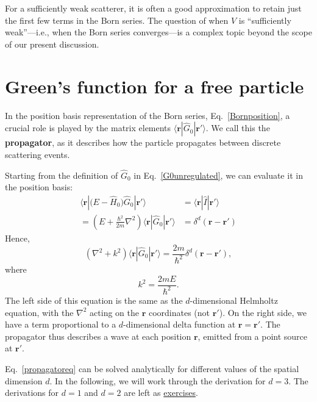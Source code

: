 \documentclass[prx,12pt]{revtex4-2}
\begin{document}
For a sufficiently weak scatterer, it is often a good approximation to
retain just the first few terms in the Born series.  The question of
when $\hat{V}$ is ``sufficiently weak''---i.e., when the Born series
converges---is a complex topic beyond the scope of our present
discussion.

\section{Green's function for a free particle}
\label{sec:freegreen}

In the position basis representation of the Born series,
Eq.~\eqref{Bornposition}, a crucial role is played by the matrix
elements $\langle\mathbf{r}|\hat{G}_0|\mathbf{r}'\rangle$.  We call
this the \textbf{propagator}, as it describes how the particle
propagates between discrete scattering events.

Starting from the definition of $\hat{G}_0$ in
Eq.~\eqref{G0unregulated}, we can evaluate it in the position basis:
\begin{align*}
  \langle\mathbf{r} |\big(E-\hat{H}_0\big) \hat{G}_0 |\mathbf{r}'\rangle &= \langle\mathbf{r}|\hat{I}|\mathbf{r}'\rangle \\
  = \left(E + \frac{\hbar^2}{2m}\nabla^2 \right) \langle\mathbf{r} |\hat{G}_0 |\mathbf{r}'\rangle &= \delta^d(\mathbf{r}-\mathbf{r}')
\end{align*}
Hence,
\begin{equation}
  \left(\nabla^2 + k^2\right) \langle\mathbf{r} |\hat{G}_0 |\mathbf{r}'\rangle = \frac{2m}{\hbar^2} \delta^d(\mathbf{r}-\mathbf{r}'),
  \label{propagatoreq}
\end{equation}
where
\begin{equation}
  k^2 = \frac{2mE}{\hbar^2}.
  \label{keq}
\end{equation}
The left side of this equation is the same as the $d$-dimensional
Helmholtz equation, with the $\nabla^2$ acting on the $\mathbf{r}$
coordinates (not $\mathbf{r}'$).  On the right side, we have a term
proportional to a $d$-dimensional delta function at $\mathbf{r} =
\mathbf{r}'$.  The propagator thus describes a wave at each position
$\mathbf{r}$, emitted from a point source at $\mathbf{r}'$.

Eq.~\eqref{propagatoreq} can be solved analytically for different
values of the spatial dimension $d$.  In the following, we will work
through the derivation for $d = 3$.  The derivations for $d = 1$ and
$d = 2$ are left as \hyperref[ex:1dpropagator]{exercises}.
\end{document}
